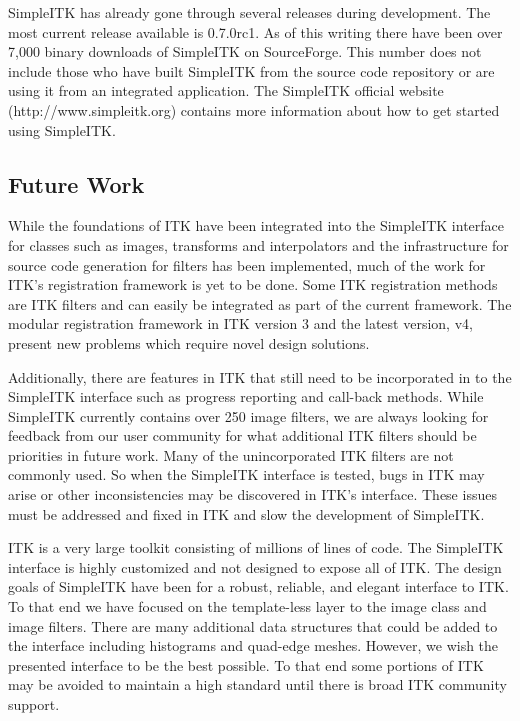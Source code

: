 \documentclass{frontiersMED} %
\begin{document}
SimpleITK has already gone through several releases during
development. The most current release available is 0.7.0rc1. As of
this writing there have been over 7,000 binary downloads of SimpleITK
on SourceForge. This number does not include those who have built SimpleITK
from the source code repository or are using it from an integrated
application. The SimpleITK official website (http://www.simpleitk.org)
contains more information about how to get started using SimpleITK.

\subsection{Future Work}
While the foundations of ITK have been integrated into the SimpleITK
interface for classes such as images, transforms and interpolators and the
infrastructure for source code generation for filters has been
implemented, much of the work for ITK's registration framework is yet
to be done. Some ITK registration methods are ITK filters and can easily
be integrated as part of the current framework. The modular
registration framework in ITK version 3 and the latest version, v4,
present new problems which require novel design solutions.

Additionally, there are features in ITK that still need to be incorporated
in to the SimpleITK interface such as progress reporting and call-back
methods. While SimpleITK currently contains over 250 image filters,
we are always looking for feedback from our user community for
what additional ITK filters should be priorities in future
work. Many of the unincorporated ITK filters are not commonly used. So when the
SimpleITK interface is tested, bugs in ITK may arise or other
inconsistencies may be discovered in ITK's interface. These issues must be
addressed and fixed in ITK and slow the development of SimpleITK.

ITK is a very large toolkit consisting of millions of lines of
code. The SimpleITK interface is highly customized and not designed to
expose all of ITK. The design goals of SimpleITK have been
for a robust, reliable, and elegant interface to ITK. To that end we
have focused on the template-less layer to the image class and image
filters.  There are many additional data structures that could be
added to the interface including histograms and quad-edge
meshes. However, we wish the presented interface to be the best
possible. To that end some portions of ITK may be avoided to
maintain a high standard until there is broad ITK community support.
\end{document}
